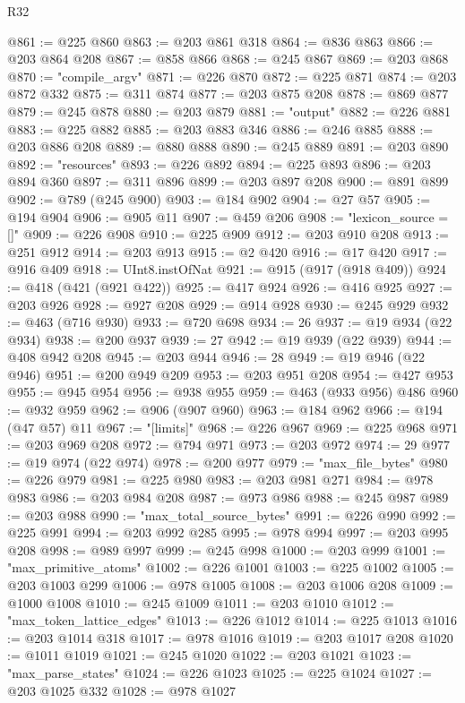 \begin{lexlean}{R32}
\begin{coremodule}
@861 := @225 @860
@863 := @203 @861 @318
@864 := @836 @863
@866 := @203 @864 @208
@867 := @858 @866
@868 := @245 @867
@869 := @203 @868
@870 := "compile_argv"
@871 := @226 @870
@872 := @225 @871
@874 := @203 @872 @332
@875 := @311 @874
@877 := @203 @875 @208
@878 := @869 @877
@879 := @245 @878
@880 := @203 @879
@881 := "output"
@882 := @226 @881
@883 := @225 @882
@885 := @203 @883 @346
@886 := @246 @885
@888 := @203 @886 @208
@889 := @880 @888
@890 := @245 @889
@891 := @203 @890
@892 := "resources"
@893 := @226 @892
@894 := @225 @893
@896 := @203 @894 @360
@897 := @311 @896
@899 := @203 @897 @208
@900 := @891 @899
@902 := @789 (@245 @900)
@903 := @184 @902
@904 := @27 @57
@905 := @194 @904
@906 := @905 @11
@907 := @459 @206
@908 := "lexicon_source = []"
@909 := @226 @908
@910 := @225 @909
@912 := @203 @910 @208
@913 := @251 @912
@914 := @203 @913
@915 := @2 @420
@916 := @17 @420
@917 := @916 @409
@918 := UInt8.instOfNat
@921 := @915 (@917 (@918 @409))
@924 := @418 (@421 (@921 @422))
@925 := @417 @924
@926 := @416 @925
@927 := @203 @926
@928 := @927 @208
@929 := @914 @928
@930 := @245 @929
@932 := @463 (@716 @930)
@933 := @720 @698
@934 := 26
@937 := @19 @934 (@22 @934)
@938 := @200 @937
@939 := 27
@942 := @19 @939 (@22 @939)
@944 := @408 @942 @208
@945 := @203 @944
@946 := 28
@949 := @19 @946 (@22 @946)
@951 := @200 @949 @209
@953 := @203 @951 @208
@954 := @427 @953
@955 := @945 @954
@956 := @938 @955
@959 := @463 (@933 @956) @486
@960 := @932 @959
@962 := @906 (@907 @960)
@963 := @184 @962
@966 := @194 (@47 @57) @11
@967 := "[limits]"
@968 := @226 @967
@969 := @225 @968
@971 := @203 @969 @208
@972 := @794 @971
@973 := @203 @972
@974 := 29
@977 := @19 @974 (@22 @974)
@978 := @200 @977
@979 := "max_file_bytes"
@980 := @226 @979
@981 := @225 @980
@983 := @203 @981 @271
@984 := @978 @983
@986 := @203 @984 @208
@987 := @973 @986
@988 := @245 @987
@989 := @203 @988
@990 := "max_total_source_bytes"
@991 := @226 @990
@992 := @225 @991
@994 := @203 @992 @285
@995 := @978 @994
@997 := @203 @995 @208
@998 := @989 @997
@999 := @245 @998
@1000 := @203 @999
@1001 := "max_primitive_atoms"
@1002 := @226 @1001
@1003 := @225 @1002
@1005 := @203 @1003 @299
@1006 := @978 @1005
@1008 := @203 @1006 @208
@1009 := @1000 @1008
@1010 := @245 @1009
@1011 := @203 @1010
@1012 := "max_token_lattice_edges"
@1013 := @226 @1012
@1014 := @225 @1013
@1016 := @203 @1014 @318
@1017 := @978 @1016
@1019 := @203 @1017 @208
@1020 := @1011 @1019
@1021 := @245 @1020
@1022 := @203 @1021
@1023 := "max_parse_states"
@1024 := @226 @1023
@1025 := @225 @1024
@1027 := @203 @1025 @332
@1028 := @978 @1027

\end{coremodule}
\end{lexlean}
